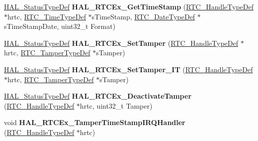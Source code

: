 \begin{DoxyCompactItemize}
\hyperlink{stm32f0xx__hal__def_8h_a63c0679d1cb8b8c684fbb0632743478f}{H\+A\+L\+\_\+\+Status\+Type\+Def} {\bfseries H\+A\+L\+\_\+\+R\+T\+C\+Ex\+\_\+\+Get\+Time\+Stamp} (\hyperlink{struct_r_t_c___handle_type_def}{R\+T\+C\+\_\+\+Handle\+Type\+Def} $\ast$hrtc, \hyperlink{struct_r_t_c___time_type_def}{R\+T\+C\+\_\+\+Time\+Type\+Def} $\ast$s\+Time\+Stamp, \hyperlink{struct_r_t_c___date_type_def}{R\+T\+C\+\_\+\+Date\+Type\+Def} $\ast$s\+Time\+Stamp\+Date, uint32\+\_\+t Format)
\item 
\mbox{\label{group___r_t_c_ex___exported___functions___group1_ga4b819431e03c521285cf3e275d930707}} 
\hyperlink{stm32f0xx__hal__def_8h_a63c0679d1cb8b8c684fbb0632743478f}{H\+A\+L\+\_\+\+Status\+Type\+Def} {\bfseries H\+A\+L\+\_\+\+R\+T\+C\+Ex\+\_\+\+Set\+Tamper} (\hyperlink{struct_r_t_c___handle_type_def}{R\+T\+C\+\_\+\+Handle\+Type\+Def} $\ast$hrtc, \hyperlink{struct_r_t_c___tamper_type_def}{R\+T\+C\+\_\+\+Tamper\+Type\+Def} $\ast$s\+Tamper)
\item 
\mbox{\label{group___r_t_c_ex___exported___functions___group1_ga4984cf38a5bbdf1f607cc94cfdf3797f}} 
\hyperlink{stm32f0xx__hal__def_8h_a63c0679d1cb8b8c684fbb0632743478f}{H\+A\+L\+\_\+\+Status\+Type\+Def} {\bfseries H\+A\+L\+\_\+\+R\+T\+C\+Ex\+\_\+\+Set\+Tamper\+\_\+\+IT} (\hyperlink{struct_r_t_c___handle_type_def}{R\+T\+C\+\_\+\+Handle\+Type\+Def} $\ast$hrtc, \hyperlink{struct_r_t_c___tamper_type_def}{R\+T\+C\+\_\+\+Tamper\+Type\+Def} $\ast$s\+Tamper)
\item 
\mbox{\label{group___r_t_c_ex___exported___functions___group1_gaf0c1b98177dbd9d20c460d6130dbad7e}} 
\hyperlink{stm32f0xx__hal__def_8h_a63c0679d1cb8b8c684fbb0632743478f}{H\+A\+L\+\_\+\+Status\+Type\+Def} {\bfseries H\+A\+L\+\_\+\+R\+T\+C\+Ex\+\_\+\+Deactivate\+Tamper} (\hyperlink{struct_r_t_c___handle_type_def}{R\+T\+C\+\_\+\+Handle\+Type\+Def} $\ast$hrtc, uint32\+\_\+t Tamper)
\item 
\mbox{\label{group___r_t_c_ex___exported___functions___group1_ga710f2cd8bab31242d496b020c182fef3}} 
void {\bfseries H\+A\+L\+\_\+\+R\+T\+C\+Ex\+\_\+\+Tamper\+Time\+Stamp\+I\+R\+Q\+Handler} (\hyperlink{struct_r_t_c___handle_type_def}{R\+T\+C\+\_\+\+Handle\+Type\+Def} $\ast$hrtc)

\end{DoxyCompactItemize}

